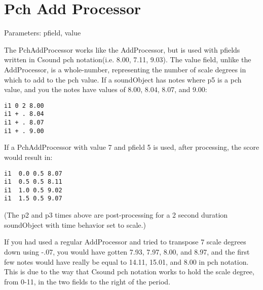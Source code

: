 \section{Pch Add Processor}\label{pchAddProcessor}

Parameters: pfield, value

The PchAddProcessor works like the AddProcessor, but is used with
pfields written in Csound pch notation(i.e. 8.00, 7.11, 9.03). The value
field, unlike the AddProcessor, is a whole-number, representing the
number of scale degrees in which to add to the pch value. If a
soundObject has notes where p5 is a pch value, and you the notes have
values of 8.00, 8.04, 8.07, and 9.00:

\begin{verbatim}
i1 0 2 8.00
i1 + . 8.04
i1 + . 8.07
i1 + . 9.00
\end{verbatim}

If a PchAddProcessor with value 7 and pfield 5 is used, after
processing, the score would result in:

\begin{verbatim}
i1  0.0 0.5 8.07
i1  0.5 0.5 8.11
i1  1.0 0.5 9.02
i1  1.5 0.5 9.07
\end{verbatim}

(The p2 and p3 times above are post-processing for a 2 second duration
soundObject with time behavior set to scale.)

If you had used a regular AddProcessor and tried to transpose 7 scale
degrees down using -.07, you would have gotten 7.93, 7.97, 8.00, and
8.97, and the first few notes would have really be equal to 14.11,
15.01, and 8.00 in pch notation. This is due to the way that Csound pch
notation works to hold the scale degree, from 0-11, in the two fields to
the right of the period.
